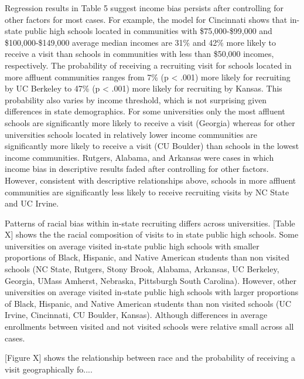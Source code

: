 \documentclass[twoside]{article}
\begin{document}
Regression results in Table 5 suggest income bias persists after controlling for other factors for most cases. For example, the model for Cincinnati shows that in-state public high schools located in communities with \$75,000-\$99,000 and \$100,000-\$149,000 average median incomes are 31\% and 42\% more likely to receive a visit than schools in communities with less than \$50,000 incomes, respectively. The probability of receiving a recruiting visit for schools located in more affluent communities ranges from 7\% (p < .001) more likely for recruiting by UC Berkeley to 47\% (p < .001) more likely for recruiting by Kansas. This probability also varies by income threshold, which is not surprising given differences in state demographics. For some universities only the most affluent schools are significantly more likely to receive a visit (Georgia) whereas for other universities schools located in relatively lower income communities are significantly more likely to receive a visit (CU Boulder) than schools in the lowest income communities. Rutgers, Alabama, and Arkansas were cases in which income bias in descriptive results faded after controlling for other factors. However, consistent with descriptive relationships above, schools in more affluent communities are significantly less likely to receive recruiting visits by NC State and UC Irvine. 

Patterns of racial bias within in-state recruiting differs across universities. [Table X] shows the the racial composition of visits to in state public high schools. Some universities on average visited in-state public high schools with smaller proportions of Black, Hispanic, and Native American students than non visited schools (NC State, Rutgers, Stony Brook, Alabama, Arkansas, UC Berkeley, Georgia, UMass Amherst, Nebraska, Pittsburgh South Carolina). However, other universities on average visited in-state public high schools with larger proportions of Black,  Hispanic, and Native American students than non visited schools (UC Irvine, Cincinnati, CU Boulder, Kansas). Although differences in average enrollments between visited and not visited schools were relative small across all cases.

[Figure X] shows the relationship between race and the probability of receiving a visit geographically fo....
\end{document}
